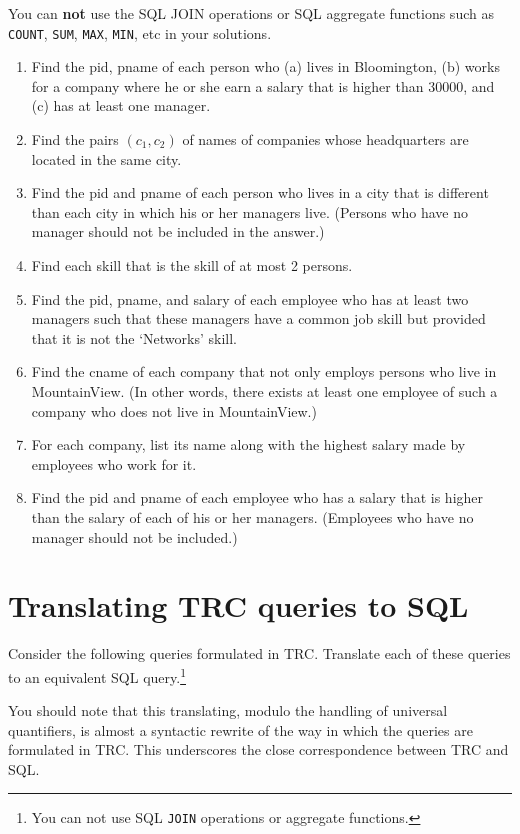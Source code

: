 \documentclass{article}
\begin{document}
 You can {\bf not} use the SQL JOIN operations or SQL aggregate functions
such as {\tt COUNT}, {\tt SUM}, {\tt MAX}, {\tt MIN}, etc in your solutions.
\begin{enumerate}[resume]
\item Find the pid, pname of each person who (a) lives in Bloomington, 
(b) works for a company where he or she earn a salary that is higher than 30000, and (c) has at least one manager.
\item Find the pairs $(c_1, c_2)$ of names of companies whose headquarters are located in the same city.
\item Find the pid and pname of each person who lives in a city that is different than each city in which his or her managers live.
(Persons who have no manager should not be included in the answer.)
\item Find each skill that is the skill of at most 2 persons.
\item Find the pid, pname, and salary of each employee who has at least two managers such that these managers have a common job skill but provided that it is not the `Networks' skill.
\item Find the cname of each company that not only employs persons                                                                      
who live in MountainView. 
(In other words, there exists at least one employee of such a company
who does not live in MountainView.)
\item For each company, list its name along with the highest salary made by employees who work for it.
\item Find the pid and pname of each employee who has a salary that is higher than the salary of each of his or her managers.
(Employees who have no manager should not be included.)

\end{enumerate}

\section{Translating TRC queries to SQL}

Consider the following queries formulated in TRC.   Translate each of these queries to an equivalent SQL query.\footnote{
You can not use SQL {\tt JOIN} operations or
aggregate functions.}

You should note that this translating, modulo the handling of universal quantifiers, is almost a syntactic rewrite of the way in which the queries are formulated in TRC.
This underscores the close correspondence between TRC and SQL.
\end{document}
